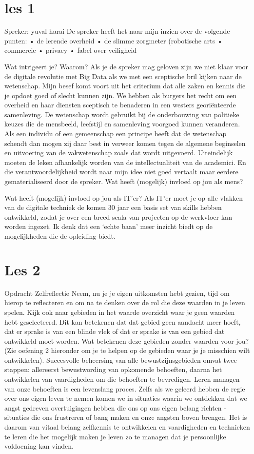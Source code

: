 \documentclass[11pt]{report}
\begin{document}
\section{les 1}


Spreker: yuval harai
De spreker heeft het naar mijn inzien over de volgende punten:
• de lerende overheid
• de slimme zorgmeter (robotische arts
• commercie
• privacy
• fabel over veiligheid


Wat intrigeert je? Waarom?
Als je de spreker mag geloven zijn we niet klaar voor de digitale revolutie met Big Data als we met een sceptische bril kijken naar de wetenschap. Mijn besef komt voort uit het criterium dat alle zaken en kennis die je opdoet goed of slecht kunnen zijn. We hebben als burgers het recht om een overheid en haar diensten sceptisch te benaderen in een westers georiënteerde samenleving. De wetenschap wordt gebruikt bij de onderbouwing van politieke keuzes die de mensbeeld, leefstijl en samenleving voorgoed kunnen veranderen. Als een individu of een gemeenschap een principe heeft dat de wetenschap schendt dan mogen zij daar best in verweer komen tegen de algemene beginselen en uitvoering van de vakwetenschap zoals dat wordt uitgevoerd. Uiteindelijk moeten de leken afhankelijk worden van de intellectualiteit van de academici. En die verantwoordelijkheid wordt naar mijn idee niet goed vertaalt maar eerdere gematerialiseerd door de spreker.
Wat heeft (mogelijk) invloed op jou als mens?

Wat heeft (mogelijk) invloed op jou als IT’er? Als IT’er moet je op alle vlakken van de digitale techniek de komen 30 jaar een basis set van skills hebben ontwikkeld, zodat je over een breed scala van projecten op de werkvloer kan worden ingezet. Ik denk dat een ‘echte baan’ meer inzicht biedt op de mogelijkheden die de opleiding biedt.

\section{Les 2}
Opdracht
Zelfreflectie Neem, nu je je eigen uitkomsten hebt gezien, tijd om hierop te reflecteren en om na te denken over de rol die deze waarden in je leven spelen. Kijk ook naar gebieden in het waarde overzicht waar je geen waarden hebt geselecteerd. Dit kan betekenen dat dat gebied geen aandacht meer hoeft, dat er sprake is van een blinde vlek of dat er sprake is van een gebied dat ontwikkeld moet worden. Wat betekenen deze gebieden zonder waarden voor jou? (Zie oefening 2 hieronder om je te helpen op de gebieden waar je je misschien wilt ontwikkelen). Succesvolle beheersing van alle bewustzijnsgebieden omvat twee stappen: allereerst bewustwording van opkomende behoeften, daarna het ontwikkelen van vaardigheden om die behoeften te bevredigen. Leren managen van onze behoeften is een levenslang proces. Zelfs als we geleerd hebben de regie over ons eigen leven te nemen komen we in situaties waarin we ontdekken dat we angst gedreven overtuigingen hebben die ons op ons eigen belang richten - situaties die ons frustreren of bang maken en onze angsten boven brengen. Het is daarom van vitaal belang zelfkennis te ontwikkelen en vaardigheden en technieken te leren die het mogelijk maken je leven zo te managen dat je persoonlijke voldoening kan vinden.
\end{document}
